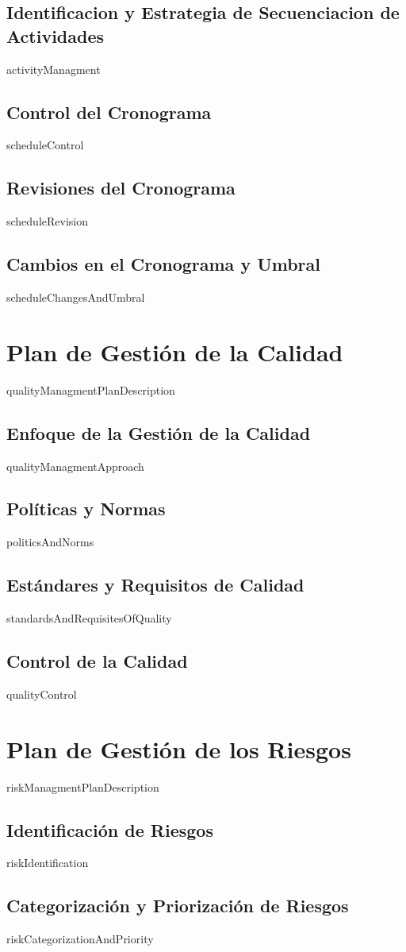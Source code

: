 \documentclass{article}
\begin{document}
\subsection{Identificacion y Estrategia de Secuenciacion de Actividades}
{{activityManagment}}
\subsection{Control del Cronograma}
{{scheduleControl}}
\subsection{Revisiones del Cronograma}
{{scheduleRevision}}
\subsection{Cambios en el Cronograma y Umbral}
{{scheduleChangesAndUmbral}}
\section{Plan de Gestión de la Calidad}
{{qualityManagmentPlanDescription}}
\subsection{Enfoque de la Gestión de la Calidad}
{{qualityManagmentApproach}}
\subsection{Políticas y Normas}
{{politicsAndNorms}}
\subsection{Estándares y Requisitos de Calidad}
{{standardsAndRequisitesOfQuality}}
\subsection{Control de la Calidad}
{{qualityControl}}
\section{Plan de Gestión de los Riesgos}
{{riskManagmentPlanDescription}}
\subsection{Identificación de Riesgos}
{{riskIdentification}}
\subsection{Categorización y Priorización de Riesgos}
{{riskCategorizationAndPriority}}
\end{document}
